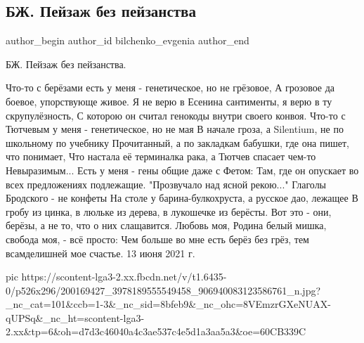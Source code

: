  
 
 
 
 
 
\subsection{БЖ. Пейзаж без пейзанства}
\label{sec:13_06_2021.fb.bilchenko_evgenia.4.pejzazh}
\ifcmt
 author_begin
   author_id bilchenko_evgenia
 author_end
\fi

БЖ. Пейзаж без пейзанства.

Что-то с берёзами есть у меня - генетическое, но не грёзовое,
А грозовое да боевое, упорствующе живое.
Я не верю в Есенина сантименты, я верю в ту скрупулёзность,
С которою он считал генокоды внутри своего конвоя.
Что-то с Тютчевым у меня - генетическое, но не мая
В начале гроза, а Silentium, не по школьному по учебнику
Прочитанный, а по закладкам бабушки, где она пишет, что понимает,
Что настала её терминалка рака, а Тютчев спасает чем-то
Невыразимым... Есть у меня - гены общие даже с Фетом:
Там, где он опускает во всех предложениях подлежащие.
"Прозвучало над ясной рекою..." Глаголы Бродского - не конфеты
На столе у барина-булкохруста, а русское дао, лежащее
В гробу из цинка, в люльке из дерева, в лукошечке из берёсты.
Вот это - они, берёзы, а не то, что о них слащавится.
Любовь моя, Родина белый мишка, свобода моя, - всё просто:
Чем больше во мне есть берёз без грёз, тем всамделишней мое счастье.
13 июня 2021 г.

\ifcmt
  pic https://scontent-lga3-2.xx.fbcdn.net/v/t1.6435-0/p526x296/200169427_3978189555549458_906940083123586761_n.jpg?_nc_cat=101&ccb=1-3&_nc_sid=8bfeb9&_nc_ohc=8VEmzrGXeNUAX-qUPSq&_nc_ht=scontent-lga3-2.xx&tp=6&oh=d7d3c46040a4c3ae537c4e5d1a3aa5a3&oe=60CB339C
\fi

